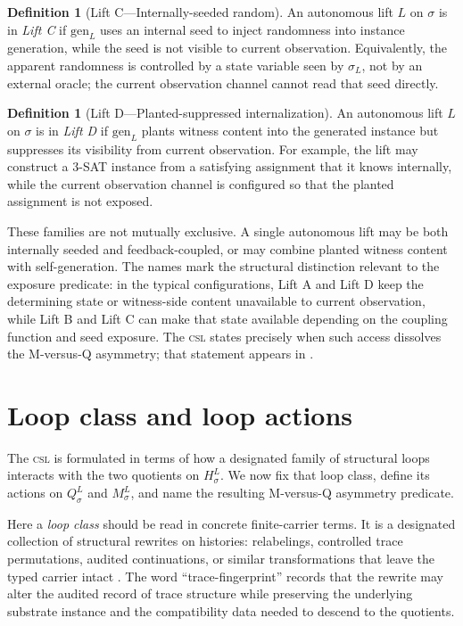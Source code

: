 \documentclass[11pt]{article}
\newcommand{\CSL}{\textsc{csl}}            \newcommand{\CSLcore}{Candidate Structural Law}
\newcommand{\Substrate}{\sigma}             \newcommand{\Lift}{L}                       \newcommand{\LiftState}{\sigma_{L}}         \newcommand{\HistorySpace}{H_{\Substrate}^{\Lift}}
\newcommand{\Qquotient}{Q_{\Substrate}^{\Lift}}
\newcommand{\Mquotient}{M_{\Substrate}^{\Lift}}
\theoremstyle{definition}
\newtheorem{definition}[theorem]{Definition}
\begin{document}
\begin{definition}[Lift C---Internally-seeded random]
\label{def:lift-family-C}
An autonomous lift \(\Lift\) on \(\Substrate\) is in \emph{Lift C} if
\(\mathrm{gen}_{\Lift}\) uses an internal seed to inject randomness
into instance generation, while the seed is not visible to current
observation.  Equivalently, the apparent randomness is controlled by a
state variable seen by \(\LiftState\), not by an external oracle; the
current observation channel cannot read that seed directly.
\end{definition}

\begin{definition}[Lift D---Planted-suppressed internalization]
\label{def:lift-family-D}
An autonomous lift \(\Lift\) on \(\Substrate\) is in \emph{Lift D} if
\(\mathrm{gen}_{\Lift}\) plants witness content into the generated
instance but suppresses its visibility from current observation.  For
example, the lift may construct a 3-SAT instance from a satisfying
assignment that it knows internally, while the current observation
channel is configured so that the planted assignment is not exposed.
\end{definition}

These families are not mutually exclusive.  A single autonomous lift
may be both internally seeded and feedback-coupled, or may combine
planted witness content with self-generation.  The names mark the
structural distinction relevant to the exposure predicate: in the
typical configurations, Lift A and Lift D keep the determining state
or witness-side content unavailable to current observation, while Lift
B and Lift C can make that state available depending on the coupling
function and seed exposure.  The \CSL{} states precisely when such
access dissolves the M-versus-Q asymmetry; that statement appears in
.
 

\section{Loop class and loop actions}
\label{sec:loop-action}

The \CSL{} is formulated in terms of how a designated family of
structural loops interacts with the two quotients on \(\HistorySpace\).
We now fix that loop class, define its actions on \(\Qquotient\) and
\(\Mquotient\), and name the resulting M-versus-Q asymmetry predicate.

Here a \emph{loop class} should be read in concrete finite-carrier
terms.  It is a designated collection of structural rewrites on
histories: relabelings, controlled trace permutations, audited
continuations, or similar transformations that leave the typed carrier
intact \citep{DummitFoote2004AbstractAlgebra}.  The word ``trace-fingerprint'' records that the rewrite may
alter the audited record of trace structure while preserving the
underlying substrate instance and the compatibility data needed to
descend to the quotients.
\end{document}
